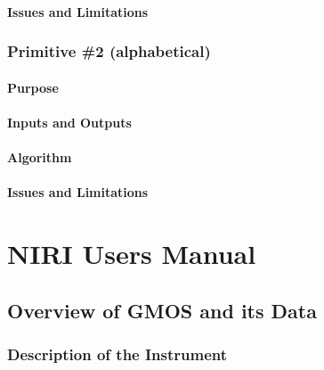 \documentclass[letterpaper,10pt,english]{sphinxmanual}
\begin{document}
\subsubsection{Issues and Limitations}
\label{NIFS/primitives_pages/primitive1:issues-and-limitations}

\subsection{Primitive \#2  (alphabetical)}
\label{NIFS/primitives_pages/primitive2:primitive-2-alphabetical}\label{NIFS/primitives_pages/primitive2:nifs-primitive-2}\label{NIFS/primitives_pages/primitive2::doc}

\subsubsection{Purpose}
\label{NIFS/primitives_pages/primitive2:purpose}

\subsubsection{Inputs and Outputs}
\label{NIFS/primitives_pages/primitive2:inputs-and-outputs}

\subsubsection{Algorithm}
\label{NIFS/primitives_pages/primitive2:algorithm}

\subsubsection{Issues and Limitations}
\label{NIFS/primitives_pages/primitive2:issues-and-limitations}

\chapter{NIRI Users Manual}
\label{NIRIcontents:niri-users-manual}\label{NIRIcontents::doc}\label{NIRIcontents:id1}

\section{Overview of GMOS and its Data}
\label{NIRI/instrument:gmos-instrument-overview}\label{NIRI/instrument:overview-of-gmos-and-its-data}\label{NIRI/instrument::doc}

\subsection{Description of the Instrument}
\label{NIRI/instrument:description-of-the-instrument}
\end{document}
